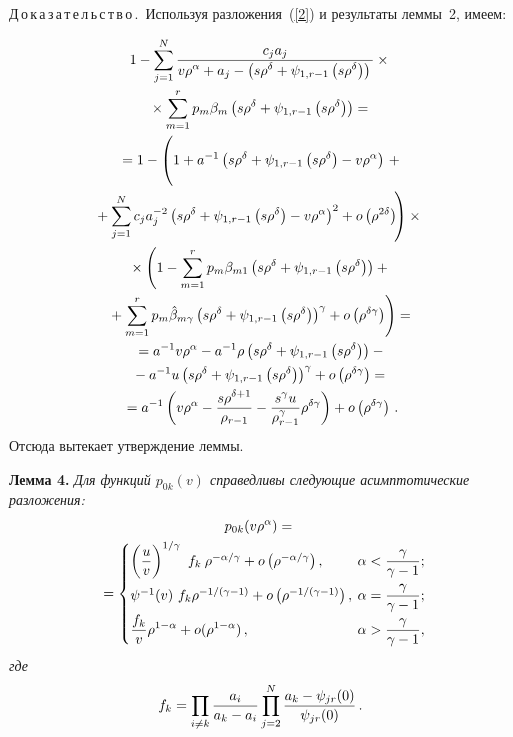 \begin{multicols}{2}
\noindent
Д\,о\,к\,а\,з\,а\,т\,е\,л\,ь\,с\,т\,в\,о\,.\
Используя разложения~(\ref{2})  и результаты леммы~2, имеем:

\noindent
\begin{multline*}
1-\sum\limits_{j=1}^N\fr{c_ja_j}{v\rho^{\alpha}+a_j-\left(s\rho^{\delta}+\psi_{1,r-1}\left(s\rho^{\delta}\right)\right)}
\times{}\\
{}\times
\sum\limits_{m=1}^rp_m\beta_m\left(s\rho^{\delta}+\psi_{1,r-1}\left(s\rho^{\delta}\right)\right)={}\\
{}=1-\left(
\vphantom{\sum\limits_{j=1}^N}
1+a^{-1}\left(s\rho^{\delta}+\psi_{1,r-1}\left(s\rho^{\delta}\right)-v\rho^{\alpha}\right)\right.+{}\\
\hspace*{-3.59697pt}\left.{}+\sum\limits_{j=1}^N
c_ja_j^{-2}\left(s\rho^{\delta}+\psi_{1,r-1}\left(s\rho^{\delta}\right)-v\rho^{\alpha}\right)^2+o\left(\rho^{2\delta}\right)
\!\right)\times{}\\
{}\times
\left(1-\sum\limits_{m=1}^rp_m\beta_{m1}
\left(s\rho^{\delta}+\psi_{1,r-1}\left(s\rho^{\delta}\right)\right)
+{}\right.\\
\left.{}+\sum\limits_{m=1}^rp_m\hat{\beta}_{m\gamma}\left(s\rho^{\delta}+\psi_{1,r-1}\left(s\rho^{\delta}\right)\right)^{\gamma}
+o\left(\rho^{\delta\gamma}\right)\right)
={}\\
{}=a^{-1}v\rho^{\alpha}-a^{-1}\rho\left(s\rho^{\delta}+\psi_{1,r-1}\left(
s\rho^{\delta}\right)\right)-{}\\
{}-a^{-1} u
\left(s\rho^{\delta}+\psi_{1,r-1}\left(s\rho^{\delta}\right)\right)^{\gamma}+
o\left(\rho^{\delta\gamma}\right)
={}\\
{}=
a^{-1}\left(v\rho^{\alpha}-\fr{s\rho^{\delta+1}}{\rho_{r-1}}-\fr{s^{\gamma}u}
{\rho_{r-1}^{\gamma}}\rho^{\delta\gamma}\right)+
o\left(\rho^{\delta\gamma}\right)\,.
\end{multline*}
Отсюда вытекает утверждение леммы.

\medskip


\noindent
\textbf{Лемма 4.} \textit{Для функций $p_{0k}(v)$ справедливы следующие асимптотические 
разложения:}
\begin{multline*}
p_{0k}(v\rho^{\alpha})
={}\\
\hspace*{-4pt}{}=\begin{cases}
\left(\fr{u}{v}\right)^{{1}/{\gamma}}\ f_k\: \rho^{-{\alpha}/{\gamma}}+
o\left(\rho^{-{\alpha}/{\gamma}}\right),&\hspace*{-6pt}\alpha<\fr{\gamma}{\gamma-1};
\\[6pt]
\psi^{-1}(v)\ f_k\rho^{-{1}/({\gamma-1})}+o\left(\rho^{-{1}/({\gamma-1})}\right),&
\hspace*{-6pt}\alpha=\fr{\gamma}{\gamma-1};\\[6pt]
\fr{f_k}{v} \rho^{1-\alpha}+o(\rho^{1-\alpha})\,,&\hspace*{-6pt}\alpha>\fr{\gamma}{\gamma-1},
\end{cases}\hspace*{-7.47086pt}
\end{multline*}
\textit{где}
$$
f_k=\prod\limits_{i\ne k}\displaystyle\frac{\displaystyle a_i\mathstrut}{\displaystyle a_k-a_i\mathstrut}
 \prod\limits_{j=2}^{N}\displaystyle\frac{\displaystyle a_k-\psi_{jr}(0)\mathstrut}{\displaystyle \psi_{jr}(0)\mathstrut}\,.
$$


\end{multicols}
